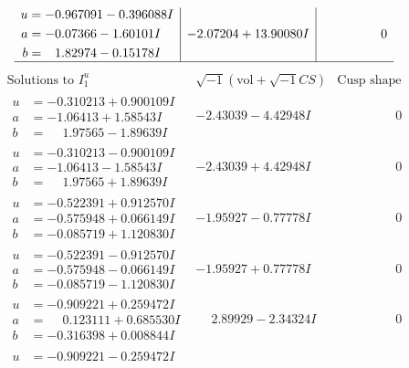 \documentclass[1p]{elsarticle_modified}
\theoremstyle{definition}
\newcommand{\I}{\sqrt{-1}}
\begin{document}
$$\begin{array}{c|c|c}
\begin{aligned}
u &= -0.967091 - 0.396088 I \\
a &= -0.07366 - 1.60101 I \\
b &= \phantom{-}1.82974 - 0.15178 I\end{aligned}
 & -2.07204 + 13.90080 I & \phantom{-0.000000 } 0\\
 \hline 
 \end{array}$$\newpage$$\begin{array}{c|c|c}  
\text{Solutions to }I^u_{1}& \I (\text{vol} + \sqrt{-1}CS) & \text{Cusp shape}\\
 \hline 
\begin{aligned}
u &= -0.310213 + 0.900109 I \\
a &= -1.06413 + 1.58543 I \\
b &= \phantom{-}1.97565 - 1.89639 I\end{aligned}
 & -2.43039 - 4.42948 I & \phantom{-0.000000 } 0 \\ \hline\begin{aligned}
u &= -0.310213 - 0.900109 I \\
a &= -1.06413 - 1.58543 I \\
b &= \phantom{-}1.97565 + 1.89639 I\end{aligned}
 & -2.43039 + 4.42948 I & \phantom{-0.000000 } 0 \\ \hline\begin{aligned}
u &= -0.522391 + 0.912570 I \\
a &= -0.575948 + 0.066149 I \\
b &= -0.085719 + 1.120830 I\end{aligned}
 & -1.95927 - 0.77778 I & \phantom{-0.000000 } 0 \\ \hline\begin{aligned}
u &= -0.522391 - 0.912570 I \\
a &= -0.575948 - 0.066149 I \\
b &= -0.085719 - 1.120830 I\end{aligned}
 & -1.95927 + 0.77778 I & \phantom{-0.000000 } 0 \\ \hline\begin{aligned}
u &= -0.909221 + 0.259472 I \\
a &= \phantom{-}0.123111 + 0.685530 I \\
b &= -0.316398 + 0.008844 I\end{aligned}
 & \phantom{-}2.89929 - 2.34324 I & \phantom{-0.000000 } 0 \\ \hline\begin{aligned}
u &= -0.909221 - 0.259472 I \\

\end{aligned}
\end{array}$$
\end{document}
